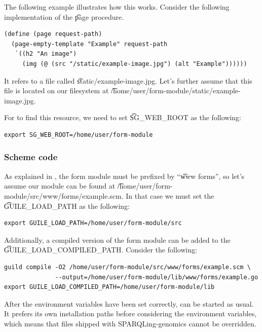   The following example illustrates how this works.  Consider the following
  implementation of the \t{page} procedure.
\begin{siderules}
\begin{verbatim}
(define (page request-path)
  (page-empty-template "Example" request-path
   `((h2 "An image")
     (img (@ (src "/static/example-image.jpg") (alt "Example"))))))
\end{verbatim}
\end{siderules}

  It refers to a file called \t{static/example-image.jpg}.  Let's further
  assume that this file is located on our filesystem at
  \t{/home/user/form-module/static/example-image.jpg}.

  For  to find this resource, we need to set \t{SG\_WEB\_ROOT}
  as the following:
\begin{siderules}
\begin{verbatim}
export SG_WEB_ROOT=/home/user/form-module
\end{verbatim}
\end{siderules}

\subsubsection{Scheme code}

  As explained in , the form module must be prefixed
  by ``\t{www forms}'', so let's assume our module can be found at
  \t{/home/user/form-module/src/www/forms/example.scm}.  In that case we must
  set the \t{GUILE\_LOAD\_PATH} as the following:
\begin{siderules}
\begin{verbatim}
export GUILE_LOAD_PATH=/home/user/form-module/src
\end{verbatim}
\end{siderules}

  Additionally, a compiled version of the form module can be added to the
  \t{GUILE\_LOAD\_COMPILED\_PATH}.  Consider the following:
\begin{siderules}
\begin{verbatim}
guild compile -O2 /home/user/form-module/src/www/forms/example.scm \
              --output=/home/user/form-module/lib/www/forms/example.go
export GUILE_LOAD_COMPILED_PATH=/home/user/form-module/lib
\end{verbatim}
\end{siderules}

  After the environment variables have been set correctly, 
  can be started as usual.  It prefers its own installation paths before
  considering the environment variables, which means that files shipped with
  SPARQLing-genomics cannot be overridden.
